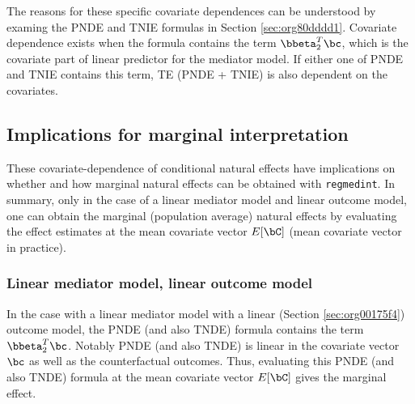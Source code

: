 \documentclass[10pt]{article}
\begin{document}
The reasons for these specific covariate dependences can be understood by examing the PNDE and TNIE formulas in Section \ref{sec:org80dddd1}. Covariate dependence exists when the formula contains the term \(\bbeta_{2}^{T}\bc\), which is the covariate part of linear predictor for the mediator model. If either one of PNDE and TNIE contains this term, TE (PNDE + TNIE) is also dependent on the covariates.\\

\subsection{Implications for marginal interpretation}
\label{sec:org3eb9c19}
These covariate-dependence of conditional natural effects have implications on whether and how marginal natural effects can be obtained with \texttt{regmedint}. In summary, only in the case of a linear mediator model and linear outcome model, one can obtain the marginal (population average) natural effects by evaluating the effect estimates at the mean covariate vector \(E[\bC]\) (mean covariate vector in practice).

\subsubsection{Linear mediator model, linear outcome model}
\label{sec:org806e7f7}
In the case with a linear mediator model with a linear (Section \ref{sec:org00175f4}) outcome model, the PNDE (and also TNDE) formula contains the term \(\bbeta_{2}^{T}\bc\). Notably PNDE (and also TNDE) is linear in the covariate vector \(\bc\) as well as the counterfactual outcomes. Thus, evaluating this PNDE (and also TNDE) formula at the mean covariate vector \(E[\bC]\) gives the marginal effect.
\end{document}
